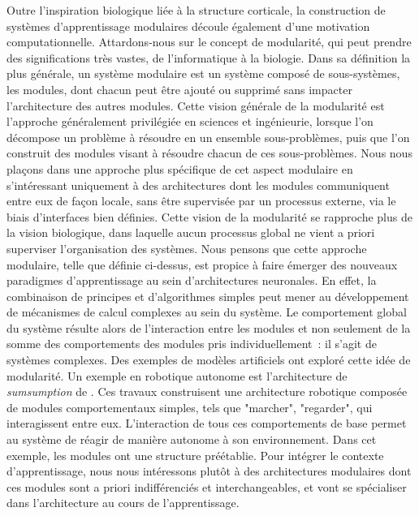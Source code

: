 Outre l'inspiration biologique liée à la structure corticale, la construction de systèmes d'apprentissage modulaires découle également d'une motivation computationnelle.
Attardons-nous sur le concept de modularité, qui peut prendre des significations très vastes, de l'informatique à la biologie. 
Dans sa définition la plus générale, un système modulaire est un système composé de sous-systèmes, les modules, dont chacun peut être ajouté ou supprimé sans impacter l'architecture des autres modules.
Cette vision générale de la modularité est l'approche généralement privilégiée en sciences et ingénieurie, lorsque l'on décompose un problème à résoudre en un ensemble sous-problèmes, puis que l'on construit des modules visant à résoudre chacun de ces sous-problèmes.
Nous nous plaçons dans une approche plus spécifique de cet aspect modulaire en s'intéressant uniquement à des architectures dont les modules communiquent entre eux de façon locale, sans être supervisée par un processus externe, via le biais d'interfaces bien définies.
Cette vision de la modularité se rapproche plus de la vision biologique, dans laquelle aucun processus global ne vient a priori superviser l'organisation des systèmes. Nous pensons que cette approche modulaire, telle que définie ci-dessus, est propice à faire émerger des nouveaux paradigmes d'apprentissage au sein d'architectures neuronales. 
En effet, la combinaison de principes et d'algorithmes simples peut mener au développement de mécanismes de calcul complexes au sein du système. Le comportement global du système résulte alors de l'interaction entre les modules et non seulement de la somme des comportements des modules pris individuellement~: il s'agit de systèmes complexes. 
Des exemples de modèles artificiels ont exploré cette idée de modularité. Un exemple en robotique autonome est l'architecture de \emph{sumsumption} de \cite{brooks_sumsumption_85}. Ces travaux construisent une architecture robotique composée de modules comportementaux simples, tels que "marcher", "regarder", qui interagissent entre eux. L'interaction de tous ces comportements de base permet au système de réagir de manière autonome à son environnement. Dans cet exemple, les modules ont une structure préétablie.
Pour intégrer le contexte d'apprentissage, nous nous intéressons plutôt à des architectures modulaires dont ces modules sont a priori indifférenciés et interchangeables, et vont se spécialiser dans l'architecture au cours de l'apprentissage.


